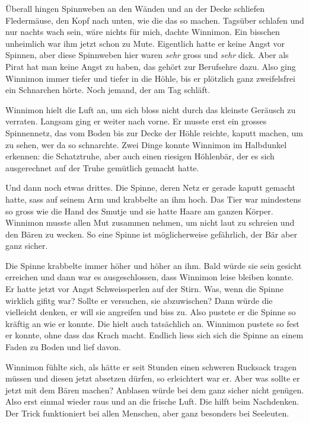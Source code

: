Überall hingen Spinnweben an den Wänden und an der Decke schliefen Fledermäuse, den Kopf nach unten, wie die das so machen. Tagsüber schlafen und nur nachts wach sein, wäre nichts für mich, dachte Winnimon. Ein bisschen unheimlich war ihm jetzt schon zu Mute. Eigentlich hatte er keine Angst vor Spinnen, aber diese Spinnweben hier waren {\itshape sehr} gross und {\itshape sehr} dick. Aber als Pirat hat man keine Angst zu haben, das gehört zur Berufsehre dazu. Also ging Winnimon immer tiefer und tiefer in die Höhle, bis er plötzlich ganz zweifelsfrei ein Schnarchen hörte. Noch jemand, der am Tag schläft.

Winnimon hielt die Luft an, um sich bloss nicht durch das kleinste Geräusch zu verraten. Langsam ging er weiter nach vorne. Er musste erst ein grosses Spinnennetz, das vom Boden bis zur Decke der Höhle reichte, kaputt machen, um zu sehen, wer da so schnarchte. Zwei Dinge konnte Winnimon im Halbdunkel erkennen: die Schatztruhe, aber auch einen riesigen Höhlenbär, der es sich ausgerechnet auf der Truhe gemütlich gemacht hatte.

Und dann noch etwas drittes. Die Spinne, deren Netz er gerade kaputt gemacht hatte, sass auf seinem Arm und krabbelte an ihm hoch. Das Tier war mindestens so gross wie die Hand des Smutje und sie hatte Haare am ganzen Körper. Winnimon musste allen Mut zusammen nehmen, um nicht laut zu schreien und den Bären zu wecken. So eine Spinne ist möglicherweise gefährlich, der Bär aber ganz sicher.

Die Spinne krabbelte immer höher und höher an ihm. Bald würde sie sein gesicht erreichen und dann war es ausgeschlossen, dass Winnimon leise bleiben konnte. Er hatte jetzt vor Angst Schweissperlen auf der Stirn. Was, wenn die Spinne wirklich gifitg war? Sollte er versuchen, sie abzuwischen? Dann würde die vielleicht denken, er will sie angreifen und biss zu. Also pustete er die Spinne so kräftig an wie er konnte. Die hielt auch tatsächlich an. Winnimon pustete so fest er konnte, ohne dass das Krach macht. Endlich liess sich sich die Spinne an einem Faden zu Boden und lief davon.

Winnimon fühlte sich, als hätte er seit Stunden einen schweren Rucksack tragen müssen und diesen jetzt absetzen dürfen, so erleichtert war er. Aber was sollte er jetzt mit dem Bären machen? Anblasen würde bei dem ganz sicher nicht genügen. Also erst einmal wieder raus und an die frische Luft. Die hilft beim Nachdenken. Der Trick funktioniert bei allen Menschen, aber ganz besonders bei Seeleuten.

